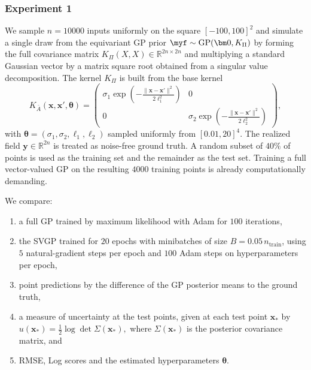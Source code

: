 \documentclass[11pt,a4paper]{article}
\newcommand{\bx}{\boldsymbol{x}}
\newcommand{\by}{\boldsymbol{y}}
\newcommand{\btheta}{\boldsymbol{\theta}}
\begin{document}
\subsubsection{Experiment 1}%
\label{subsubsec:so2-exp1}
We sample $n=10000$ inputs uniformly on the square $[-100,100]^2$ and simulate a single draw from the equivariant GP prior
$\myf\sim\mathrm{GP}(\bm 0,K_\Pi)$ by forming the full covariance matrix $K_\Pi(X,X)\in\mathbb{R}^{2n\times 2n}$ and multiplying a
standard Gaussian vector by a matrix square root obtained from a singular value decomposition. The kernel $K_\Pi$ is built from the base kernel
\begin{equation*}
    K_{\bar{A}}(\bx,\bx',\btheta)=\begin{pmatrix}
        \sigma_1\exp{\left(-\frac{\|\bx-\bx'\|^2}{2\ell_1^2}\right)} & 0 \\
        0& \sigma_2\exp{\left(-\frac{\|\bx-\bx'\|^2}{2\ell_2^2}\right)}
    \end{pmatrix},
\end{equation*}
with $\btheta=(\sigma_1,\sigma_2,\ell_1,\ell_2)$ sampled uniformly from $[0.01,20]^4.$ The realized field $\by\in\mathbb{R}^{2n}$
is treated as noise-free ground truth. A random subset of $40\%$ of points is used as the training set and the remainder as the test set. Training a full vector-valued GP on the resulting $4000$ training points is already computationally demanding.

We compare:
\begin{enumerate}
    \item a full GP trained by maximum likelihood with Adam for $100$ iterations,
    \item the SVGP trained for $20$ epochs with minibatches of size $B=0.05\,n_{\mathrm{train}}$, using $5$ natural-gradient steps per epoch and $100$ Adam steps on hyperparameters per epoch,
    \item %
    point predictions by the difference of the GP posterior means to the ground truth, 
    \item a measure of uncertainty at the test points, given at each test point $\bx_\ast$ by
    \begin{math}
        u(\bx_\ast)=\tfrac12\log\det\Sigma(\bx_\ast),
    \end{math} where $\Sigma(\bx_\ast)$ is the posterior covariance matrix, and
    \item RMSE, Log scores and the estimated hyperparameters $\btheta.$
\end{enumerate}
\end{document}
